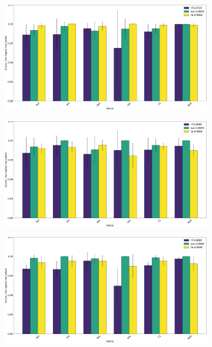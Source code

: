 \begin{figure}
	\begin{subfigure}{0.5\linewidth}
		\includegraphics[width=\linewidth]{img/An_Bn_Cnmod_ta.png}
		\subcaption{\an, \bn, \cnmod}
	\end{subfigure}
	\begin{subfigure}{0.5\linewidth}
		\includegraphics[width=\linewidth]{img/An_Bn_Phi_ta.png}
		\subcaption{\an, \bn, \phin}
	\end{subfigure}
	\begin{subfigure}{0.5\linewidth}
		\includegraphics[width=\linewidth]{img/An_Cnmod_Phi_ta.png}

\end{subfigure}
\end{figure}
